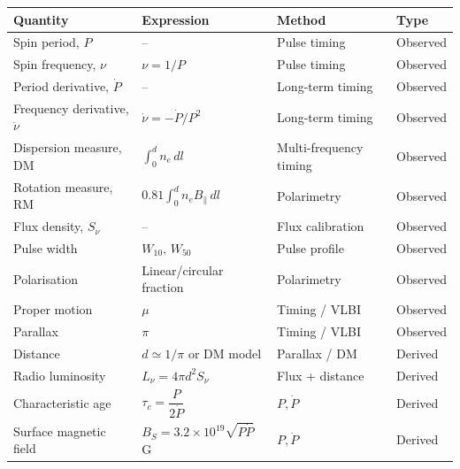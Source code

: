 \begin{table}[ht]

\centering

\begin{tabular}{llll}
\hline
\textbf{Quantity} & \textbf{Expression} & \textbf{Method} & \textbf{Type} \\
\hline
Spin period, $P$ &
-- &
Pulse timing &
Observed \\

Spin frequency, $\nu$ &
$\nu = 1/P$ &
Pulse timing &
Observed \\

Period derivative, $\dot P$ &
-- &
Long-term timing &
Observed \\

Frequency derivative, $\dot{\nu}$ &
$\dot{\nu}=-\dot{P}/P^2$ &
Long-term timing &
Observed \\

Dispersion measure, DM &
$\displaystyle \int_0^d n_e\,dl$ &
Multi-frequency timing &
Observed \\

Rotation measure, RM &
$\displaystyle 0.81\int_0^d n_eB_\parallel\,dl$ &
Polarimetry &
Observed \\

Flux density, $S_\nu$ &
-- &
Flux calibration &
Observed \\

Pulse width &
$W_{10},\,W_{50}$ &
Pulse profile &
Observed \\

Polarisation &
Linear/circular fraction &
Polarimetry &
Observed \\

Proper motion &
$\mu$ &
Timing / VLBI &
Observed \\

Parallax &
$\pi$ &
Timing / VLBI &
Observed \\

\hline

Distance &
$d\simeq1/\pi$ or DM model &
Parallax / DM &
Derived \\

Radio luminosity &
$L_\nu=4 \pi d^2  S_\nu $ &
Flux + distance &
Derived \\

Characteristic age &
$\tau_c=\dfrac{P}{2\dot P}$ &
$P,\dot P$ &
Derived \\

Surface magnetic field &
$B_S=3.2\times10^{19}\sqrt{P\dot P}$ G &
$P,\dot P$ &
Derived \\


\end{tabular}
\end{table}
